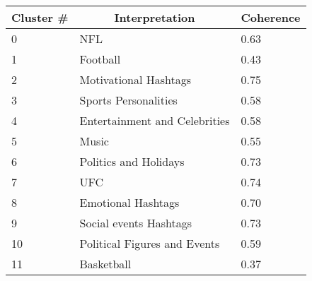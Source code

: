 \begin{table}[h]
\centering
\begin{tabular}{|l|l|l|}
\hline
\multicolumn{1}{|c|}{\textbf{Cluster \#}} & \multicolumn{1}{c|}{\textbf{Interpretation}}                    & \multicolumn{1}{c|}{\textbf{Coherence}} \\ \hline
0                                         & NFL                                                             & 0.63                                    \\ \hline
1                                         & Football                                                        & 0.43                                    \\ \hline
2                                         & Motivational Hashtags                                           & 0.75                                    \\ \hline
3                                         & Sports Personalities                                            & 0.58                                    \\ \hline
4                                         & Entertainment and Celebrities                                   & 0.58                                    \\ \hline
5                                         & Music                                                           & 0.55                                    \\ \hline
6                                         & Politics and Holidays                                           & 0.73                                    \\ \hline
7                                         & UFC                                                             & 0.74                                    \\ \hline
8                                         & Emotional Hashtags                                              & 0.70                                    \\ \hline
9                                         & Social events Hashtags                                          & 0.73                                    \\ \hline
10                                        & Political Figures and Events                                    & 0.59                                    \\ \hline
11                                        & Basketball                                                      & 0.37                                    \\ \hline

\end{tabular}
\end{table}
